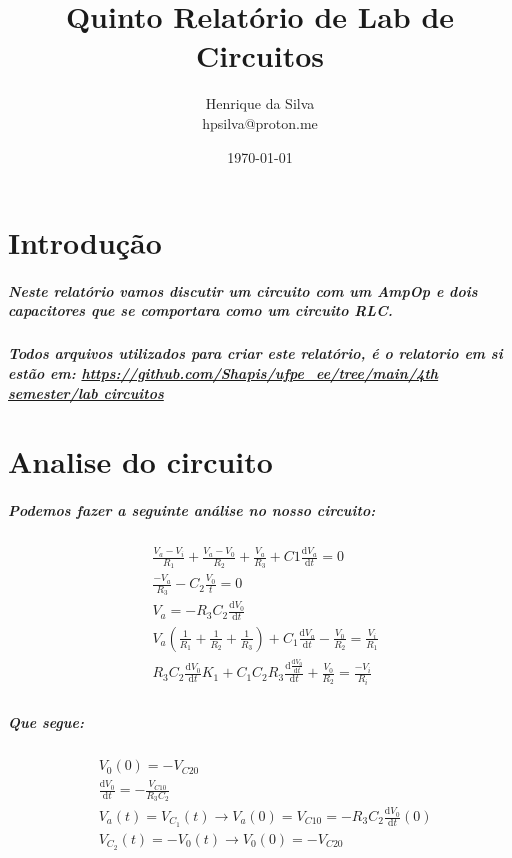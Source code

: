 \documentclass[12pt,twoside, a4paper, twocolumn]{article}
\title{Quinto Relatório de Lab de Circuitos}
\author{Henrique da Silva \\ hpsilva@proton.me}
\date{\today}
\newcommand\deriv[2]{\frac{\mathrm d #1}{\mathrm d #2}}
\begin{document}
\maketitle
{}
\newpage
\tableofcontents
\newpage



\section{Introdução}

\subparagraph*{Neste relatório vamos discutir um circuito com um AmpOp e dois capacitores que se comportara como um circuito RLC.}

\subparagraph*{Todos arquivos utilizados para criar este relatório, é o relatorio em si estão em:  \url{https://github.com/Shapis/ufpe_ee/tree/main/4th semester/lab circuitos}}


\section{Analise do circuito}

\subparagraph*{Podemos fazer a seguinte análise no nosso circuito:}

\begin{equation*}
    \begin{aligned}
         & \frac{V_a - V_i}{R_1} + \frac{V_a-V_0}{R_2} + \frac{V_a}{R_3}  + C1 \deriv{V_a}{t} = 0                                  \\
         & \frac{-V_a}{R_3} - C_2 \frac{V_0}{t} = 0                                                                                \\
         & V_a = -R_3 C_2 \deriv{V_0}{t}                                                                                           \\
         & V_a \left(\frac{1}{R_1} + \frac{1}{R_2} + \frac{1}{R_3}\right) + C_1 \deriv{V_a}{t} - \frac{V_0}{R_2} = \frac{V_i}{R_1} \\
         & R_3 C_2 \deriv{V_0}{t} K_1 + C_1 C_2 R_3 \deriv{\deriv{V_0}{t}}{t} + \frac{V_0}{R_2} = \frac{-V_i}{R_i}                 \\
    \end{aligned}
\end{equation*}

\subparagraph*{Que segue:}


\begin{equation*}
    \begin{aligned}
         & V_0(0) = - V_{C20}                                                             \\
         & \deriv{V_0}{t} = - \frac{V_{C10}}{R_3 C_2}                                     \\
         & V_a(t) = V_{C_1}(t) \rightarrow V_a(0) = V_{C10} = - R_3 C_2 \deriv{V_0}{t}(0) \\
         & V_{C_2}(t) = - V_0(t) \rightarrow V_0(0) = -V_{C20}                            \\
    \end{aligned}
\end{equation*}
\end{document}
